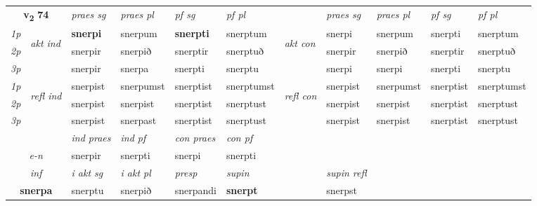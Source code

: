 \noindent
\begin{tabular}{lllllllllll} \toprule
\multicolumn{2}{c}{\textbf{v{\textsubscript{2}}} \Large{\textbf{74}}}  &  \textit{praes sg}  & \textit{praes pl}  &\textit{ pf sg} & \textit{pf pl} &  &  \textit{praes sg}  & \textit{praes pl}  & \textit{pf sg} & \textit{pf pl } \\*
	\cmidrule{3-6} \cmidrule{8-11}
 {\textit{1p}} & \multirow{3}{*}{\begin{turn}{90}\textit{akt ind}\end{turn}} & \textbf{snerpi} & snerpum & \textbf{snerpti} & snerptum & \multirow{3}{*}{\begin{turn}{90}\textit{akt con}\end{turn}} &snerpi & snerpum & snerpti & snerptum\\*
 {\textit{2p}} &  &  snerpir  & snerpið & snerptir & snerptuð & & snerpir & snerpið & snerptir & snerptuð \\*
{\textit{3p}} &  & snerpir & snerpa & snerpti & snerptu & & snerpi & snerpi& snerpti & snerptu \\*
\cmidrule{3-6} \cmidrule{8-11}
 {\textit{1p}} & \multirow{3}{*}{\begin{turn}{90}\textit{refl ind}\end{turn}}  & snerpist & snerpumst & snerptist & snerptumst & \multirow{3}{*}{\begin{turn}{90}\textit{refl con}\end{turn}}  &snerpist & snerpumst & snerptist & snerptumst \\*
 {\textit{2p}} &  & snerpist & snerpist & snerptist & snerptust & &snerpist & snerpist & snerptist & snerptust \\*
 {\textit{3p}}  & & snerpist & snerpast & snerptist & snerptust & & snerpist & snerpist& snerptist & snerptust \\*
\cmidrule{3-6} \cmidrule{8-11}

   & &  \textit{ind praes} & \textit{ind pf} & \textit{con praes} & \textit{con pf} \\*
\multicolumn{2}{c}{ \textit{e-n} } & snerpir & snerpti & snerpi & snerpti \\*

\cmidrule{3-8}
   \multicolumn{2}{c}{\textit{inf}}  & \textit{i akt sg} & \textit{i akt pl}   & \textit{presp} & \textit{supin} && \textit{supin refl}  \\*
  \multicolumn{2}{c}{\textbf{snerpa}} & snerptu  & snerpið   & snerpandi &  \textbf{snerpt} && snerpst  \\*
\end{tabular}

